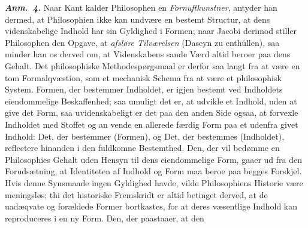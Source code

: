\documentclass[12pt]{book}
\newcommand{\anm}[1]{\emph{\textbf{Anm.~#1.}}}
\newcommand{\opage}[1]{\marginnote{\footnotesize\textit{[#1]}}}
\begin{document}
\anm{4} Naar Kant kalder Philosophen en \emph{Fornuftkunstner}, antyder han dermed,
at Philosophien ikke kan undvære en bestemt Structur, at dens videnskabelige Indhold
har sin Gyldighed i Formen; naar Jacobi derimod stiller Philosophen den Opgave, at
\emph{afsløre Tilværelsen} (Daseyn zu enthüllen), saa minder han os derved om, at
Videnskabens sande Værd altid beroer paa dens Gehalt. Det philosophiske
Methodespørgsmaal er derfor saa langt fra at være en tom Formalqvæstion, som et
mechanisk Schema fra at være et philosophisk System. Formen, der bestemmer Indholdet,
er igjen bestemt ved Indholdets eiendommelige Beskaffenhed; saa umuligt det er, at
udvikle et Indhold, uden at give det Form, saa uvidenskabeligt er det paa den anden
Side ogsaa, at forvexle Indholdet med Stoffet og an%
\opage{94}%
vende en allerede færdig Form paa et udenfra givet Indhold: Det, der bestemmer
(Formen), og Det, der bestemmes (Indholdet), reflectere hinanden i den fuldkomne
Bestemthed. Den, der vil bedømme en Philosophies Gehalt uden Hensyn til dens
eiendommelige Form, gaaer ud fra den Forudsætning, at Identiteten af Indhold og Form
maa beroe paa begges Forskjel. Hvis denne Synsmaade ingen Gyldighed havde, vilde
Philosophiens Historie være meningsløs; thi det historiske Fremskridt er altid
betinget derved, at de uadæqvate og forældede Former bortkastes, for at deres
væsentlige Indhold kan reproduceres i en ny Form. Den, der paastaaer, at den
\end{document}
